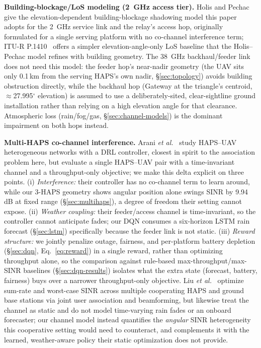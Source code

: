 \documentclass[]{ieeeaccess}
\begin{document}
\textbf{Building-blockage/LoS modeling (2~GHz access tier).} Holis and Pechac~\cite{holispechac2008} give the elevation-dependent building-blockage shadowing model this paper adopts for the 2~GHz service link and the relay's access hop, originally formulated for a single serving platform with no co-channel interference term; ITU-R P.1410~\cite{itu_p1410} offers a simpler elevation-angle-only LoS baseline that the Holis--Pechac model refines with building geometry. The 38~GHz backhaul/feeder link does not need this model: the feeder hop's near-nadir geometry (the UAV sits only 0.1\,km from the serving HAPS's own nadir, \S\ref{sec:topology}) avoids building obstruction directly, while the backhaul hop (Gateway at the triangle's centroid, $\approx$27.995$^\circ$ elevation) is assumed to use a deliberately-sited, clear-sightline ground installation rather than relying on a high elevation angle for that clearance. Atmospheric loss (rain/fog/gas, \S\ref{sec:channel-models}) is the dominant impairment on both hops instead.

\textbf{Multi-HAPS co-channel interference.} Arani \emph{et al.}~\cite{arani2023} study HAPS--UAV heterogeneous networks with a DRL controller, closest in spirit to the association problem here, but evaluate a single HAPS--UAV pair with a time-invariant channel and a throughput-only objective; we make this delta explicit on three points. (i) \emph{Interference:} their controller has no co-channel term to learn around, while our 3-HAPS geometry shows angular position alone swings SINR by 9.94\,dB at fixed range (\S\ref{sec:multihaps}), a degree of freedom their setting cannot expose. (ii) \emph{Weather coupling:} their feeder/access channel is time-invariant, so the controller cannot anticipate fades; our DQN consumes a six-horizon LSTM rain forecast (\S\ref{sec:lstm}) specifically because the feeder link is not static. (iii) \emph{Reward structure:} we jointly penalize outage, fairness, and per-platform battery depletion (\S\ref{sec:dqn}, Eq.~\eqref{eq:reward}) in a single reward, rather than optimizing throughput alone, so the comparison against rule-based max-throughput/max-SINR baselines (\S\ref{sec:dqn-results}) isolates what the extra state (forecast, battery, fairness) buys over a narrower throughput-only objective. Liu \emph{et al.}~\cite{liu2026multihaps} optimize sum-rate and worst-case SINR across multiple cooperating HAPS and ground base stations via joint user association and beamforming, but likewise treat the channel as static and do not model time-varying rain fades or an onboard forecaster; our channel model instead quantifies the \emph{angular} SINR heterogeneity this cooperative setting would need to counteract, and complements it with the learned, weather-aware policy their static optimization does not provide.
\end{document}
